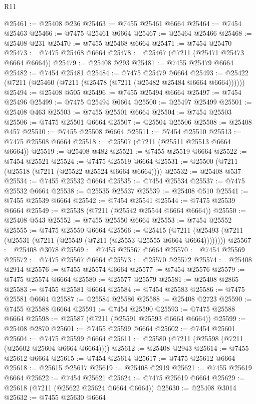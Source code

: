 \begin{lexlean}{R11}
\begin{coremodule}
@25461 := @25408 @236
@25463 := @7455 @25461 @6664
@25464 := @7454 @25463
@25466 := @7475 @25461 @6664
@25467 := @25464 @25466
@25468 := @25408 @231
@25470 := @7455 @25468 @6664
@25471 := @7454 @25470
@25473 := @7475 @25468 @6664
@25478 := @25467 (@7211 (@25471 @25473 @6664 @6664))
@25479 := @25408 @293
@25481 := @7455 @25479 @6664
@25482 := @7454 @25481
@25484 := @7475 @25479 @6664
@25493 := @25422 (@7211 (@25460 (@7211 (@25478 (@7211 (@25482 @25484 @6664 @6664))))))
@25494 := @25408 @505
@25496 := @7455 @25494 @6664
@25497 := @7454 @25496
@25499 := @7475 @25494 @6664
@25500 := @25497 @25499
@25501 := @25408 @463
@25503 := @7455 @25501 @6664
@25504 := @7454 @25503
@25506 := @7475 @25501 @6664
@25507 := @25504 @25506
@25508 := @25408 @457
@25510 := @7455 @25508 @6664
@25511 := @7454 @25510
@25513 := @7475 @25508 @6664
@25518 := @25507 (@7211 (@25511 @25513 @6664 @6664))
@25519 := @25408 @482
@25521 := @7455 @25519 @6664
@25522 := @7454 @25521
@25524 := @7475 @25519 @6664
@25531 := @25500 (@7211 (@25518 (@7211 (@25522 @25524 @6664 @6664))))
@25532 := @25408 @537
@25534 := @7455 @25532 @6664
@25535 := @7454 @25534
@25537 := @7475 @25532 @6664
@25538 := @25535 @25537
@25539 := @25408 @510
@25541 := @7455 @25539 @6664
@25542 := @7454 @25541
@25544 := @7475 @25539 @6664
@25549 := @25538 (@7211 (@25542 @25544 @6664 @6664))
@25550 := @25408 @543
@25552 := @7455 @25550 @6664
@25553 := @7454 @25552
@25555 := @7475 @25550 @6664
@25566 := @25415
    (@7211 (@25493 (@7211 (@25531 (@7211 (@25549 (@7211 (@25553 @25555 @6664 @6664))))))))
@25567 := @25408 @3078
@25569 := @7455 @25567 @6664
@25570 := @7454 @25569
@25572 := @7475 @25567 @6664
@25573 := @25570 @25572
@25574 := @25408 @2914
@25576 := @7455 @25574 @6664
@25577 := @7454 @25576
@25579 := @7475 @25574 @6664
@25580 := @25577 @25579
@25581 := @25408 @2865
@25583 := @7455 @25581 @6664
@25584 := @7454 @25583
@25586 := @7475 @25581 @6664
@25587 := @25584 @25586
@25588 := @25408 @2723
@25590 := @7455 @25588 @6664
@25591 := @7454 @25590
@25593 := @7475 @25588 @6664
@25598 := @25587 (@7211 (@25591 @25593 @6664 @6664))
@25599 := @25408 @2870
@25601 := @7455 @25599 @6664
@25602 := @7454 @25601
@25604 := @7475 @25599 @6664
@25611 := @25580 (@7211 (@25598 (@7211 (@25602 @25604 @6664 @6664))))
@25612 := @25408 @2943
@25614 := @7455 @25612 @6664
@25615 := @7454 @25614
@25617 := @7475 @25612 @6664
@25618 := @25615 @25617
@25619 := @25408 @2919
@25621 := @7455 @25619 @6664
@25622 := @7454 @25621
@25624 := @7475 @25619 @6664
@25629 := @25618 (@7211 (@25622 @25624 @6664 @6664))
@25630 := @25408 @3014
@25632 := @7455 @25630 @6664

\end{coremodule}
\end{lexlean}
